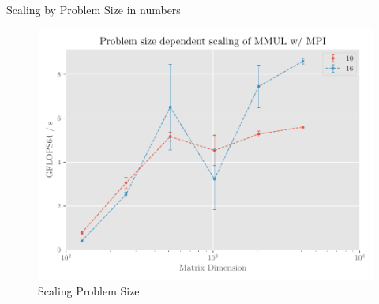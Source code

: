 \documentclass[]{scrartcl}
\begin{document}
\begin{table}[ht]
    \centering
    
    \caption{Scaling by Problem Size in numbers}\label{tab:prob}
\end{table}
\begin{figure}[H]
    \centering
    \includegraphics[width=\linewidth]{img/scaling_prob.pdf}
    \caption{Scaling Problem Size}%
    \label{fig:scaling_prob}
\end{figure}
\end{document}
